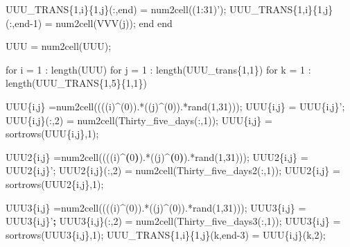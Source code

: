 \documentclass[
]{article}
\newenvironment{Shaded}{\begin{snugshade}}{\end{snugshade}}
\newcommand{\DataTypeTok}[1]{\textcolor[rgb]{0.13,0.29,0.53}{#1}}
\newcommand{\ExtensionTok}[1]{#1}
\newcommand{\KeywordTok}[1]{\textcolor[rgb]{0.13,0.29,0.53}{\textbf{#1}}}
\newcommand{\NormalTok}[1]{#1}
\newcommand{\StringTok}[1]{\textcolor[rgb]{0.31,0.60,0.02}{#1}}
\begin{document}
\begin{Shaded}
\begin{Highlighting}[]
{{{{{{{{{{{{        \ExtensionTok{UUU_TRANS}\DataTypeTok{\{1,i\}\{1,j\}}\NormalTok{(:,end) = }\ExtensionTok{num2cell}\NormalTok{((1:31)}\StringTok{');}
\StringTok{        UUU_TRANS\{1,i\}\{1,j\}(:,end-1) = num2cell(VVV(j));}
\StringTok{        }
\StringTok{        }
\StringTok{        }
\StringTok{    end}
\StringTok{    }
\StringTok{end}

\StringTok{UUU = num2cell(UUU);}
\StringTok{%


\StringTok{for i = 1 : length(UUU)}
\StringTok{    for j = 1 : length(UUU_trans\{1,1\})}
\StringTok{        for k = 1 : length(UUU_TRANS\{1,5\}\{1,1\})}
\StringTok{            %
\StringTok{            UUU\{i,j\} =num2cell((((i)^(0)).*((j)^(0)).*rand(1,31)));}
\StringTok{            UUU\{i,j\} = UUU\{i,j\}'}\NormalTok{;}
            \ExtensionTok{UUU}\DataTypeTok{\{i,j\}}\NormalTok{(:,2) = }\ExtensionTok{num2cell}\NormalTok{(Thirty_five_days(:,1));}
            \ExtensionTok{UUU}\DataTypeTok{\{i,j\}}\NormalTok{ = sortrows(UUU}\DataTypeTok{\{i,j\}}\NormalTok{,1);}
            
            \ExtensionTok{%
            \ExtensionTok{UUU2}\DataTypeTok{\{i,j\}}\NormalTok{ =num2cell((((i)^}\KeywordTok{(}\ExtensionTok{0}\KeywordTok{)}\NormalTok{)}\ExtensionTok{.*}\NormalTok{((j)^}\KeywordTok{(}\ExtensionTok{0}\KeywordTok{)}\NormalTok{)}\ExtensionTok{.*rand}\NormalTok{(1,31)));}
            \ExtensionTok{UUU2}\DataTypeTok{\{i,j\}}\NormalTok{ = UUU2}\DataTypeTok{\{i,j\}}\StringTok{';}
\StringTok{            UUU2\{i,j\}(:,2) = num2cell(Thirty_five_days2(:,1));}
\StringTok{            UUU2\{i,j\} = sortrows(UUU2\{i,j\},1);}
\StringTok{            %
\StringTok{            UUU3\{i,j\} =num2cell((((i)^(0)).*((j)^(0)).*rand(1,31)));}
\StringTok{            UUU3\{i,j\} = UUU3\{i,j\}'}\KeywordTok{;}
            \ExtensionTok{UUU3}\DataTypeTok{\{i,j\}}\NormalTok{(:,2) = }\ExtensionTok{num2cell}\NormalTok{(Thirty_five_days3(:,1));}
            \ExtensionTok{UUU3}\DataTypeTok{\{i,j\}}\NormalTok{ = sortrows(UUU3}\DataTypeTok{\{i,j\}}\NormalTok{,1);}
            \ExtensionTok{%
            \ExtensionTok{UUU_TRANS}\DataTypeTok{\{1,i\}\{1,j\}}\NormalTok{(k,end-3) = }\ExtensionTok{UUU}\DataTypeTok{\{i,j\}}\NormalTok{(k,2);}
            
}}}}}}}}}}}}}}}}}
\end{Highlighting}
\end{Shaded}
\end{document}
